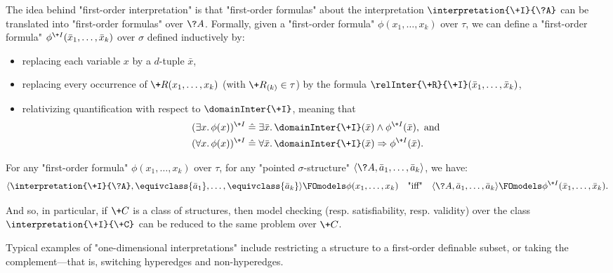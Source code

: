 The idea behind "first-order interpretation" is that
"first-order formulas" about the interpretation $\interpretation{\+I}{\?A}$
can be translated into "first-order formulas" over $\?A$.
Formally, given a "first-order formula" $\phi(x_1,\hdots,x_k)$ over $\tau$,
we can define a "first-order formula" $\phi^{\+I}(\bar x_1,\hdots,\bar x_k)$ over $\sigma$
defined inductively by:
\begin{itemize}
	\item replacing each variable $x$ by a $d$-tuple $\bar x$,
	\item replacing every occurrence of
		$\+R(x_1,\hdots, x_k)$ (with $\+R_{(k)} \in \tau$)
		by the formula $\relInter{\+R}{\+I}(\bar x_1, \hdots, \bar x_k)$,
	\item relativizing quantification with respect to $\domainInter{\+I}$,
		meaning that
		\begin{align*}
			(\exists x.\, \phi(x))^{\+I} 
			& \defeq \exists \bar x.\, \domainInter{\+I}(\bar x) \land \phi^{\+I}(\bar x),
			\text{ and} \\ 
			(\forall x.\, \phi(x))^{\+I} 
			& \defeq \forall \bar x.\, \domainInter{\+I}(\bar x) \Rightarrow \phi^{\+I}(\bar x).
		\end{align*}
\end{itemize} 
\begin{proposition}
	\AP\label{prop:first-order-interpretation}
	For any "first-order formula" $\phi(x_1,\hdots,x_k)$ over $\tau$,
	for any "pointed $\sigma$-structure" $\tup{\?A, \bar a_1,\hdots, \bar a_k}$, we have:
	\[
		\tup{\interpretation{\+I}{\?A}, \equivclass{\bar a_1}, \hdots, \equivclass{\bar a_k}}
		\FOmodels \phi(x_1, \hdots, x_k)
		\quad\text{"iff"}\quad
		\tup{\?A, \bar a_1,\hdots, \bar a_k} \FOmodels \phi^{\+I}(\bar x_1,\hdots,\bar x_k).
	\]
\end{proposition}
And so, in particular, if $\+C$ is a class of structures, then
model checking (resp. satisfiability, resp. validity) over the class $\interpretation{\+I}{\+C}$
can be reduced to the same problem over $\+C$.

Typical examples of "one-dimensional interpretations" include
restricting a structure to a first-order definable subset, 
or taking the complement---that is, switching hyperedges and non-hyperedges.

